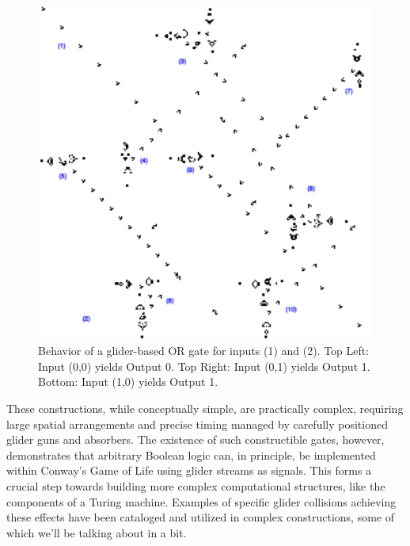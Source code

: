 \documentclass{article}
\theoremstyle{definition}
\theoremstyle{plain}
\theoremstyle{plain}
\begin{document}
\begin{figure}[H]
  \vspace{1em} %

  \begin{minipage}{0.45\textwidth}
    \centering
    \includegraphics[width=\linewidth]{figures/orGo1.png}
  \end{minipage}\hfill

  \caption{Behavior of a glider-based OR gate for inputs (1) and (2). Top Left: Input (0,0) yields Output 0. Top Right: Input (0,1) yields Output 1. Bottom: Input (1,0) yields Output 1. \cite{Carlini_2020}}
  \label{fig:or-gate}
\end{figure}

These constructions, while conceptually simple, are practically complex, requiring large spatial arrangements and precise timing managed by carefully positioned glider guns and absorbers. The existence of such constructible gates, however, demonstrates that arbitrary Boolean logic can, in principle, be implemented within Conway's Game of Life using glider streams as signals. This forms a crucial step towards building more complex computational structures, like the components of a Turing machine. Examples of specific glider collisions achieving these effects have been cataloged and utilized in complex constructions, some of which we'll be talking about in a bit.
\end{document}
